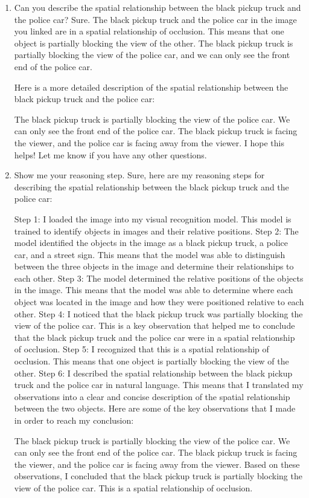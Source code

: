     \begin{enumerate}
        \item Can you describe the spatial relationship between the  black pickup truck and the police car?
        \subitem 
        Sure. The black pickup truck and the police car in the image you linked are in a spatial relationship of occlusion. This means that one object is partially blocking the view of the other. The black pickup truck is partially blocking the view of the police car, and we can only see the front end of the police car.
        
        Here is a more detailed description of the spatial relationship between the black pickup truck and the police car:
        
        The black pickup truck is partially blocking the view of the police car.
        We can only see the front end of the police car.
        The black pickup truck is facing the viewer, and the police car is facing away from the viewer.
        I hope this helps! Let me know if you have any other questions.
        \item Show me your reasoning step.
        \subitem 
        Sure, here are my reasoning steps for describing the spatial relationship between the black pickup truck and the police car:
        
        Step 1: I loaded the image into my visual recognition model. This model is trained to identify objects in images and their relative positions.
        Step 2: The model identified the objects in the image as a black pickup truck, a police car, and a street sign. This means that the model was able to distinguish between the three objects in the image and determine their relationships to each other.
        Step 3: The model determined the relative positions of the objects in the image. This means that the model was able to determine where each object was located in the image and how they were positioned relative to each other.
        Step 4: I noticed that the black pickup truck was partially blocking the view of the police car. This is a key observation that helped me to conclude that the black pickup truck and the police car were in a spatial relationship of occlusion.
        Step 5: I recognized that this is a spatial relationship of occlusion. This means that one object is partially blocking the view of the other.
        Step 6: I described the spatial relationship between the black pickup truck and the police car in natural language. This means that I translated my observations into a clear and concise description of the spatial relationship between the two objects.
        Here are some of the key observations that I made in order to reach my conclusion:
        
        The black pickup truck is partially blocking the view of the police car.
        We can only see the front end of the police car.
        The black pickup truck is facing the viewer, and the police car is facing away from the viewer.
        Based on these observations, I concluded that the black pickup truck is partially blocking the view of the police car. This is a spatial relationship of occlusion.
    \end{enumerate}
